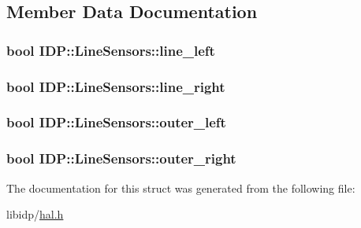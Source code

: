 \subsection{Member Data Documentation}
\hypertarget{structIDP_1_1LineSensors_a7b100b91da805356d2d138311029bc5a}{
\subsubsection[{line\_\-left}]{\setlength{\rightskip}{0pt plus 5cm}bool {\bf IDP::LineSensors::line\_\-left}}}
\label{structIDP_1_1LineSensors_a7b100b91da805356d2d138311029bc5a}
\hypertarget{structIDP_1_1LineSensors_a13a49feb63d5ced6b51b1d5be7f5109a}{
\subsubsection[{line\_\-right}]{\setlength{\rightskip}{0pt plus 5cm}bool {\bf IDP::LineSensors::line\_\-right}}}
\label{structIDP_1_1LineSensors_a13a49feb63d5ced6b51b1d5be7f5109a}
\hypertarget{structIDP_1_1LineSensors_a51c88077f39fead3a34ef115bdcdc7f1}{
\subsubsection[{outer\_\-left}]{\setlength{\rightskip}{0pt plus 5cm}bool {\bf IDP::LineSensors::outer\_\-left}}}
\label{structIDP_1_1LineSensors_a51c88077f39fead3a34ef115bdcdc7f1}
\hypertarget{structIDP_1_1LineSensors_a73f08dd5931bdc244d94f578f7dd0a17}{
\subsubsection[{outer\_\-right}]{\setlength{\rightskip}{0pt plus 5cm}bool {\bf IDP::LineSensors::outer\_\-right}}}
\label{structIDP_1_1LineSensors_a73f08dd5931bdc244d94f578f7dd0a17}


The documentation for this struct was generated from the following file:\begin{DoxyCompactItemize}
\item 
libidp/\hyperlink{hal_8h}{hal.h}\end{DoxyCompactItemize}
